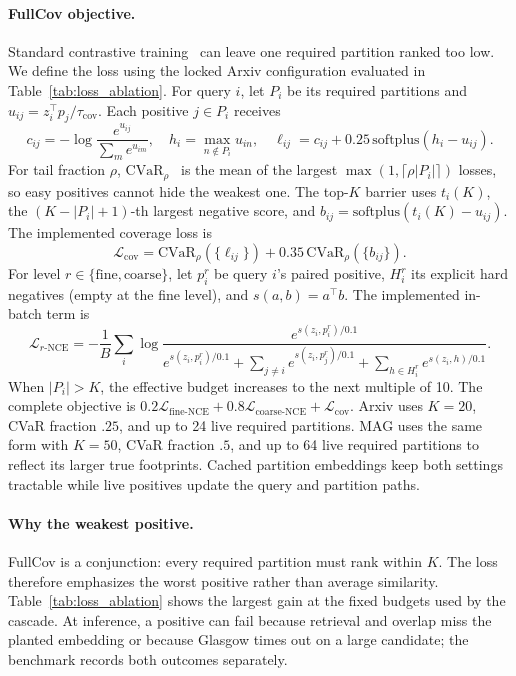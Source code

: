 \documentclass{article}
\begin{document}
\paragraph{FullCov objective.}
Standard contrastive training~\cite{ref_cpc} can leave one required partition ranked too low. We define the loss using the locked Arxiv configuration evaluated in Table~\ref{tab:loss_ablation}. For query $i$, let $P_i$ be its required partitions and $u_{ij}=z_i^\top p_j/\tau_{\mathrm{cov}}$. Each positive $j\in P_i$ receives
\begin{equation}
c_{ij}=-\log\frac{e^{u_{ij}}}{\sum_m e^{u_{im}}},\quad
h_i=\max_{n\notin P_i}u_{in},\quad
\ell_{ij}=c_{ij}+0.25\,\mathrm{softplus}(h_i-u_{ij}).
\end{equation}
For tail fraction $\rho$, $\mathrm{CVaR}_{\rho}$~\cite{ref_cvar} is the mean of the largest $\max(1,\lceil \rho|P_i|\rceil)$ losses, so easy positives cannot hide the weakest one. The top-$K$ barrier uses $t_i(K)$, the $(K-|P_i|+1)$-th largest negative score, and $b_{ij}=\mathrm{softplus}(t_i(K)-u_{ij})$. The implemented coverage loss is
\begin{equation}
\mathcal{L}_{\mathrm{cov}}=
\mathrm{CVaR}_{\rho}(\{\ell_{ij}\})+
0.35\,\mathrm{CVaR}_{\rho}(\{b_{ij}\}).
\end{equation}
For level $r\in\{\mathrm{fine},\mathrm{coarse}\}$, let $p_i^r$ be query $i$'s paired positive, $H_i^r$ its explicit hard negatives (empty at the fine level), and $s(a,b)=a^\top b$. The implemented in-batch term is
\begin{equation}
\mathcal{L}_{r\text{-NCE}}=-\frac{1}{B}\sum_i\log
\frac{e^{s(z_i,p_i^r)/0.1}}
{e^{s(z_i,p_i^r)/0.1}+\sum_{j\ne i}e^{s(z_i,p_j^r)/0.1}+\sum_{h\in H_i^r}e^{s(z_i,h)/0.1}}.
\end{equation}
When $|P_i|>K$, the effective budget increases to the next multiple of 10. The complete objective is $0.2\mathcal{L}_{\mathrm{fine\text{-}NCE}}+0.8\mathcal{L}_{\mathrm{coarse\text{-}NCE}}+\mathcal{L}_{\mathrm{cov}}$. Arxiv uses $K{=}20$, CVaR fraction $.25$, and up to 24 live required partitions. MAG uses the same form with $K{=}50$, CVaR fraction $.5$, and up to 64 live required partitions to reflect its larger true footprints. Cached partition embeddings keep both settings tractable while live positives update the query and partition paths.

\paragraph{Why the weakest positive.}
FullCov is a conjunction: every required partition must rank within $K$. The loss therefore emphasizes the worst positive rather than average similarity. Table~\ref{tab:loss_ablation} shows the largest gain at the fixed budgets used by the cascade. At inference, a positive can fail because retrieval and overlap miss the planted embedding or because Glasgow times out on a large candidate; the benchmark records both outcomes separately.
\end{document}
